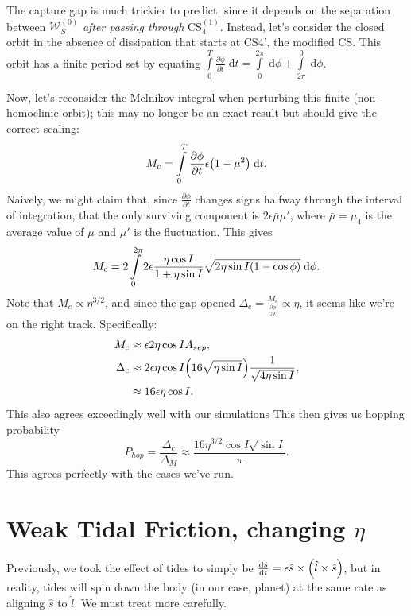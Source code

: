 \documentclass[11pt,
        usenames, %
        dvipsnames %
    ]{article}
\newcommand*{\rd}[2]{\frac{\mathrm{d}#1}{\mathrm{d}#2}}
\newcommand*{\pd}[2]{\frac{\partial#1}{\partial#2}}
\DeclarePairedDelimiter\p{\lparen}{\rparen}
\begin{document}
The capture gap is much trickier to predict, since it depends on the separation
between $\mathcal{W}^{(0)}_S$ \emph{after passing through} CS$_4^{(1)}$.
Instead, let's consider the closed orbit in the absence of dissipation that
starts at CS4', the modified CS\@. This orbit has a finite period set by
equating $\int\limits_0^T \pd{\phi}{t}\;\mathrm{d}t =
\int\limits_0^{2\pi}\;\mathrm{d}\phi + \int\limits_{2\pi}^0\;\mathrm{d}\phi$.

Now, let's reconsider the Melnikov integral when perturbing this finite
(non-homoclinic orbit); this may no longer be an exact result but should give
the correct scaling:
\begin{equation}
    M_c = \int\limits_0^T \pd{\phi}{t}\epsilon \p*{1 - \mu^2}\;\mathrm{d}t.
\end{equation}
Naively, we might claim that, since $\pd{\phi}{t}$ changes signs halfway through
the interval of integration, that the only surviving component is $2\epsilon
\bar{\mu}\mu'$, where $\bar{\mu} = \mu_4$ is the average value of $\mu$ and
$\mu'$ is the fluctuation. This gives
\begin{equation}
    M_c = 2\int\limits_0^{2\pi}2\epsilon \frac{\eta \cos I}{1 + \eta \sin I}
        \sqrt{2\eta \sin I \p*{1 - \cos \phi}}\;\mathrm{d}\phi.
\end{equation}
Note that $M_c \propto \eta^{3/2}$, and since the gap opened $\Delta_c =
\frac{M_c}{\pd{\phi}{t}} \propto \eta$, it seems like we're on the right track.
Specifically:
\begin{align}
    M_c &\approx \epsilon 2\eta \cos I A_{sep},\\
    \Delta_c &\approx 2\epsilon \eta \cos I \p*{16 \sqrt{\eta \sin I}}
        \frac{1}{\sqrt{4\eta \sin I}},\\
        &\approx 16\epsilon \eta \cos I.
\end{align}
This also agrees exceedingly well with our simulations This then gives us
hopping probability
\begin{equation}
    P_{hop} = \frac{\Delta_c}{\Delta_M} \approx
        \frac{16\eta^{3/2}\cos I \sqrt{\sin I}}{\pi}.
\end{equation}
This agrees perfectly with the cases we've run.

\section{Weak Tidal Friction, changing $\eta$}

Previously, we took the effect of tides to simply be $\rd{\hat{s}}{t} = \epsilon
\hat{s} \times \p*{\hat{l} \times \hat{s}}$, but in reality, tides will spin
down the body (in our case, planet) at the same rate as aligning $\hat{s}$ to
$\hat{l}$. We must treat more carefully.
\end{document}
